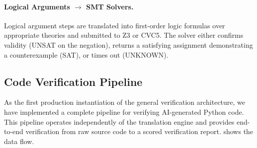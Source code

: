 \documentclass[11pt,a4paper]{article}
\begin{document}
\paragraph{Logical Arguments $\rightarrow$ SMT Solvers.}
Logical argument steps are translated into first-order logic formulas
over appropriate theories and submitted to Z3 or CVC5.  The solver either
confirms validity (UNSAT on the negation), returns a satisfying
assignment demonstrating a counterexample (SAT), or times out (UNKNOWN).

\subsection{Code Verification Pipeline}
\label{sec:codeverify}

As the first production instantiation of the general verification
architecture, we have implemented a complete pipeline for verifying
AI-generated Python code.  This pipeline operates independently of the
translation engine and provides end-to-end verification from raw source
code to a scored verification report.   shows the
data flow.
\end{document}

